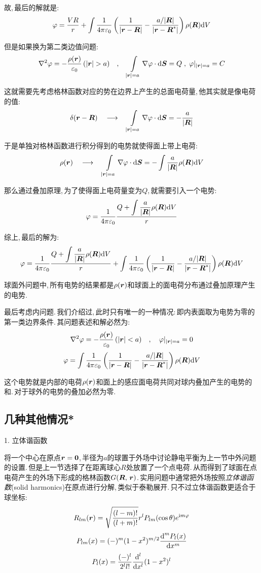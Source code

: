 故,\,最后的解就是:
\[\varphi=\frac{VR}{r}+\int \frac{1}{4\pi\varepsilon_0} \left(\frac{1}{|\boldsymbol{r}-\boldsymbol{R}|}-\frac{a/|\boldsymbol{R}|}{|\boldsymbol{r}-\boldsymbol{R}^\ast|}\right)\rho(\boldsymbol{R})\textrm{d} V\]

但是如果换为第二类边值问题:
\[\nabla^2\varphi = -\frac{\rho(\bs{r})}{\varepsilon_0}\,(|\bs{r}|>a)\quad ,\quad \int\limits_{|\bs{r}|=a}\nabla\varphi\cdot \ud \bs{S}=Q\;,\;\varphi|_{|\bs{r}|=a}=C\]

这就需要先考虑格林函数对应的势在边界上产生的总面电荷量,\,他其实就是像电荷的值:
\[\delta(\boldsymbol{r}-\boldsymbol{R})\quad \longrightarrow\quad  \int\limits_{|\boldsymbol{r}|=a}\nabla\varphi\cdot \textrm{d} \boldsymbol{S}=-\frac{a}{|\boldsymbol{R}|}\]

于是单独对格林函数进行积分得到的电势就使得面上带上电荷:
\[\rho(\boldsymbol{r})\quad \longrightarrow\quad \int\limits_{|\boldsymbol{r}|=a}\nabla\varphi\cdot \textrm{d} \boldsymbol{S}=-\int \frac{a}{|\boldsymbol{R}|}\rho(\boldsymbol{R})\textrm{d} V\]

那么通过叠加原理,\,为了使得面上电荷量变为$Q$,\,就需要引入一个电势:
\[\varphi=\frac{1}{4\pi\varepsilon_0} \frac{Q+\displaystyle\int \frac{a}{|\boldsymbol{R}|}\rho(\boldsymbol{R})\textrm{d} V}{r}\]

综上,\,最后的解为:
\[\varphi =\frac{1}{4\pi\varepsilon_0} \frac{Q+\displaystyle\int \frac{a}{|\boldsymbol{R}|}\rho(\boldsymbol{R})\textrm{d} V}{r}+\int \frac{1}{4\pi\varepsilon_0} \left(\frac{1}{|\boldsymbol{r}-\boldsymbol{R}|}-\frac{a/|\boldsymbol{R}|}{|\boldsymbol{r}-\boldsymbol{R}^\ast|}\right)\rho(\boldsymbol{R})\textrm{d} V \]

球面外问题中,\,所有电势的结果都是$\rho(\boldsymbol{r})$和球面上的面电荷分布通过叠加原理产生的电势.

最后考虑内问题.\,我们介绍过,\,此时只有唯一的一种情况:\,即内表面取为电势为零的第一类边界条件.\,其问题表述和解必然为:
\[\nabla^2\varphi = -\frac{\rho(\boldsymbol{r})}{\varepsilon_0}\,(|\boldsymbol{r}|<a)\quad ,\quad \varphi|_{|\boldsymbol{r}|=a}=0\]
\[\varphi=\int \frac{1}{4\pi\varepsilon_0} \left(\frac{1}{|\boldsymbol{r}-\boldsymbol{R}|}-\frac{a/|\boldsymbol{R}|}{|\boldsymbol{r}-\boldsymbol{R}^\ast|}\right)\rho(\boldsymbol{R})\textrm{d} V\]

这个电势就是内部的电荷$\rho(\boldsymbol{r})$和面上的感应面电荷共同对球内叠加产生的电势的和.\,对于球外的电势的叠加必然为零.

\subsection{几种其他情况*}

\vspace{0.2cm}
1. 立体谐函数
\vspace{0.2cm}

将一个中心在原点$\boldsymbol{r}=\boldsymbol{0}$,\,半径为$a$的球置于外场中讨论静电平衡为上一节中外问题的设置.\,但是上一节选择了在距离球心$R$处放置了一个点电荷.\,从而得到了球面在点电荷产生的外场下形成的格林函数$G(\boldsymbol{R},\,\boldsymbol{r})$.\,实用问题中通常把外场按照\emph{立体谐函数}(solid harmonics)在原点进行分解,\,类似于泰勒展开.\,只不过立体谐函数更适合于球坐标:
\[R_{lm}(\boldsymbol{r})=\sqrt{\frac{(l-m)!}{(l+m)!}}r^lP_{lm}(\cos\theta)e^{{\rm i} m\varphi}\]
\[P_{lm}(x)=(-)^m(1-x^2)^{m/2}\frac{\textrm{d}^mP_l(x)}{\textrm{d} x^m}\]
\[P_l(x)=\frac{(-)^l}{2^ll!}\frac{\textrm{d}^l}{\textrm{d} x^l}(1-x^2)^l\]

